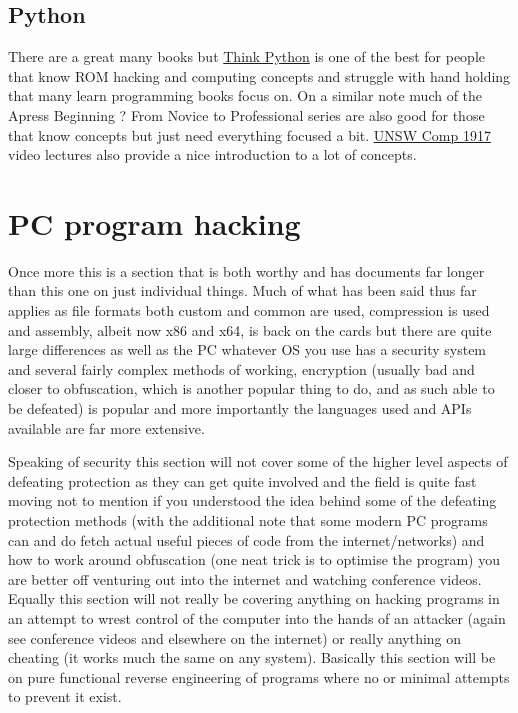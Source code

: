 \documentclass[
]{book}
\begin{document}
\hypertarget{python}{%
\section{Python}\label{python}}

There are a great many books but \href{http://greenteapress.com/thinkpython/thinkpython.html}{Think Python} is one of the best for people that know ROM hacking and computing concepts and struggle with hand holding that many learn programming books focus on. On a similar note much of the Apress Beginning ? From Novice to Professional series are also good for those that know concepts but just need everything focused a bit. \href{http://www.youtube.com/watch?v=hE7l6Adoiiw\&feature=BFa\&list=PL6B940F08B9773B9F}{UNSW Comp 1917} video lectures also provide a nice introduction to a lot of concepts.

\hypertarget{pc-program-hacking}{%
\chapter{PC program hacking}\label{pc-program-hacking}}

Once more this is a section that is both worthy and has documents far longer than this one on just individual things. Much of what has been said thus far applies as file formats both custom and common are used, compression is used and assembly, albeit now x86 and x64, is back on the cards but there are quite large differences as well as the PC whatever OS you use has a security system and several fairly complex methods of working, encryption (usually bad and closer to obfuscation, which is another popular thing to do, and as such able to be defeated) is popular and more importantly the languages used and APIs available are far more extensive.

Speaking of security this section will not cover some of the higher level aspects of defeating protection as they can get quite involved and the field is quite fast moving not to mention if you understood the idea behind some of the defeating protection methods (with the additional note that some modern PC programs can and do fetch actual useful pieces of code from the internet/networks) and how to work around obfuscation (one neat trick is to optimise the program) you are better off venturing out into the internet and watching conference videos. Equally this section will not really be covering anything on hacking programs in an attempt to wrest control of the computer into the hands of an attacker (again see conference videos and elsewhere on the internet) or really anything on cheating (it works much the same on any system). Basically this section will be on pure functional reverse engineering of programs where no or minimal attempts to prevent it exist.
\end{document}

